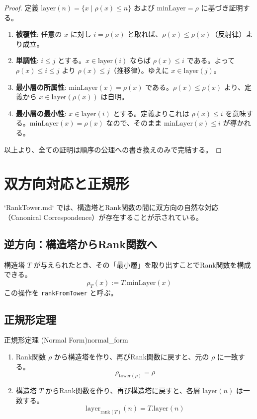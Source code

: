 \documentclass[report, paper=a4, fontsize=11pt, openany]{jlreq}
\newcommand{\layer}{\mathrm{layer}}
\newcommand{\minLayer}{\mathrm{minLayer}}
\newcommand{\rank}{\rho}
\begin{document}
\begin{proof}
定義 $\layer(n) = \{ x \mid \rank(x) \le n \}$ および $\minLayer = \rank$ に基づき証明する。
\begin{enumerate}
    \item \textbf{被覆性}: 任意の $x$ に対し $i = \rank(x)$ と取れば、$\rank(x) \le \rank(x)$（反射律）より成立。
    \item \textbf{単調性}: $i \le j$ とする。$x \in \layer(i)$ ならば $\rank(x) \le i$ である。よって $\rank(x) \le i \le j$ より $\rank(x) \le j$（推移律）。ゆえに $x \in \layer(j)$。
    \item \textbf{最小層の所属性}: $\minLayer(x) = \rank(x)$ である。$\rank(x) \le \rank(x)$ より、定義から $x \in \layer(\rank(x))$ は自明。
    \item \textbf{最小層の最小性}: $x \in \layer(i)$ とする。定義よりこれは $\rank(x) \le i$ を意味する。$\minLayer(x) = \rank(x)$ なので、そのまま $\minLayer(x) \le i$ が導かれる。
\end{enumerate}
以上より、全ての証明は順序の公理への書き換えのみで完結する。
\end{proof}

\chapter{双方向対応と正規形}

`RankTower.md` では、構造塔とRank関数の間に双方向の自然な対応（Canonical Correspondence）が存在することが示されている。

\section{逆方向：構造塔からRank関数へ}

構造塔 $T$ が与えられたとき、その「最小層」を取り出すことでRank関数を構成できる。
\[
    \rank_T(x) := T.\minLayer(x)
\]
この操作を \texttt{rankFromTower} と呼ぶ。

\section{正規形定理}

\begin{theorem}{正規形定理 (Normal Form)}{normal_form}
\begin{enumerate}
    \item Rank関数 $\rho$ から構造塔を作り、再びRank関数に戻すと、元の $\rho$ に一致する。
    \[ \rank_{\text{tower}(\rho)} = \rho \]
    \item 構造塔 $T$ からRank関数を作り、再び構造塔に戻すと、各層 $\layer(n)$ は一致する。
    \[ \layer_{\text{rank}(T)}(n) = T.\layer(n) \]
\end{enumerate}
\end{theorem}
\end{document}
